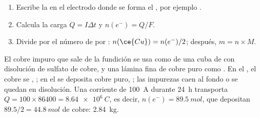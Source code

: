 \begin{method}\label{met:g12:cells-and-electrolysis:mass}
\begin{enumerate}
  \item Escribe la  en el electrodo donde se forma el ,
        por ejemplo .
  \item Calcula la carga $Q = I \Delta t$ y $n(e^-) = Q/F$.
  \item Divide por el número de  por : $n(\ce{Cu}) =
        n(e^-)/2$; después, $m = n \times M$.
\end{enumerate}
\end{method}


\begin{example}\label{ex:g12:cells-and-electrolysis:refining}
El cobre impuro que sale de la fundición se usa como  de una cuba
de  con disolución de sulfato de cobre, y una lámina fina de
cobre puro como . En el , el cobre se ,
; en el  se deposita cobre puro,
; las impurezas caen al fondo o se quedan en
disolución. Una corriente de \qty{100}{A} durante \qty{24}{h} transporta
$Q = 100 \times 86400 = \qty{8.64e6}{C}$, es decir,
$n(e^-) = \qty{89.5}{mol}$, que depositan $89.5/2 = \qty{44.8}{mol}$ de
cobre: \qty{2.84}{kg}.
\end{example}

